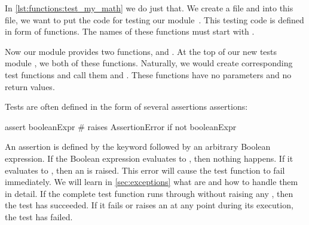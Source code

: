 %
%
%

In \cref{lst:functions:test_my_math} we do just that.
We create a file  and into this file, we want to put the code for testing our module~.
This testing code is defined in form of functions.
The names of these functions must start with .

Now our module  provides two functions,  and .
At the top of our new tests module , we  both of these functions.
Naturally, we would create corresponding test functions and call them  and .
These functions have no parameters and no return values.

Tests are often defined in the form of several assertions assertions:%
%
\begin{pythonSyntax}
assert booleanExpr  # raises AssertionError if not booleanExpr
\end{pythonSyntax}
%
An assertion is defined by the keyword  followed by an arbitrary Boolean expression.
If the Boolean expression evaluates to , then nothing happens.
If it evaluates to , then an  is raised.
This error will cause the test function to fail immediately.
We will learn in \cref{sec:exceptions} what  are and how to handle them in detail.
If the complete test function runs through without raising any , then the test has succeeded.
If it fails or raises an  at any point during its execution, the test has failed.

